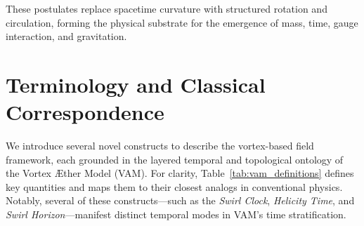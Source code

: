 \documentclass[12pt]{article}
\begin{document}
\noindent These postulates replace spacetime curvature with structured rotation and circulation, forming the physical substrate for the emergence of mass, time, gauge interaction, and gravitation.

\section*{Terminology and Classical Correspondence}

We introduce several novel constructs to describe the vortex-based field framework, each grounded in the layered temporal and topological ontology of the Vortex Æther Model (VAM). For clarity, Table~\ref{tab:vam_definitions} defines key quantities and maps them to their closest analogs in conventional physics. Notably, several of these constructs—such as the \emph{Swirl Clock}, \emph{Helicity Time}, and \emph{Swirl Horizon}—manifest distinct temporal modes in VAM’s time stratification.
\end{document}
